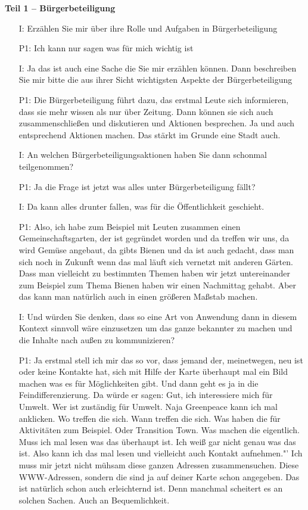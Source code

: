 \textbf{Teil 1 -- B{\"u}rgerbeteiligung}
\begin{itemize}
    \item[I:] Erz{\"a}hlen Sie mir {\"u}ber ihre Rolle und Aufgaben in B{\"u}rgerbeteiligung
    \item[P1:] Ich kann nur sagen was f{\"u}r mich wichtig ist
    \item[I:] Ja das ist auch eine Sache die Sie mir erz{\"a}hlen k{\"o}nnen. Dann beschreiben Sie mir bitte die aus ihrer Sicht wichtigsten Aspekte der B{\"u}rgerbeteiligung
    \item[P1:] Die B{\"u}rgerbeteiligung f{\"u}hrt dazu, das erstmal Leute sich informieren, dass sie mehr wissen als nur {\"u}ber Zeitung. Dann k{\"o}nnen sie sich auch zusammenschlie{\ss}en und diskutieren und Aktionen besprechen. Ja und auch entsprechend Aktionen machen. Das st{\"a}rkt im Grunde eine Stadt auch.
    \item[I:] An welchen B{\"u}rgerbeteiligungsaktionen haben Sie dann schonmal teilgenommen?
	\item[P1:] Ja die Frage ist jetzt was alles unter B{\"u}rgerbeteiligung f{\"a}llt?
	\item[I:] Da kann alles drunter fallen, was f{\"u}r die Öffentlichkeit geschieht.
	\item[P1:] Also, ich habe zum Beispiel mit Leuten zusammen einen Gemeinschaftsgarten, der ist gegr{\"u}ndet worden und da treffen wir uns, da wird Gem{\"u}se angebaut, da gibts Bienen und da ist auch gedacht, dass man sich noch in Zukunft wenn das mal l{\"a}uft sich vernetzt mit anderen G{\"a}rten. Dass man vielleicht zu bestimmten Themen haben wir jetzt untereinander zum Beispiel zum Thema Bienen haben wir einen Nachmittag gehabt. Aber das kann man nat{\"u}rlich auch in einen gr{\"o}{\ss}eren Ma{\ss}stab machen.
	\item[I:] Und w{\"u}rden Sie denken, dass so eine Art von Anwendung dann in diesem Kontext sinnvoll w{\"a}re einzusetzen um das ganze bekannter zu machen und die Inhalte nach au{\ss}en zu kommunizieren?
	\item[P1:] Ja erstmal stell ich mir das so vor, dass jemand der, meinetwegen, neu ist oder keine Kontakte hat, sich mit Hilfe der Karte {\"u}berhaupt mal ein Bild machen was es f{\"u}r M{\"o}glichkeiten gibt. Und dann geht es ja in die Feindifferenzierung. Da w{\"u}rde er sagen: Gut, ich interessiere mich f{\"u}r Umwelt. Wer ist zust{\"a}ndig f{\"u}r Umwelt. Naja Greenpeace kann ich mal anklicken. Wo treffen die sich. Wann treffen die sich. Was haben die f{\"u}r Aktivit{\"a}ten zum Beispiel. Oder Transition Town. Was machen die eigentlich. Muss ich mal lesen was das {\"u}berhaupt ist. Ich wei{\ss} gar nicht genau was das ist. Also kann ich das mal lesen und vielleicht auch Kontakt aufnehmen."' Ich muss mir jetzt nicht m{\"u}hsam diese ganzen Adressen zusammensuchen. Diese WWW-Adressen, sondern die sind ja auf deiner Karte schon angegeben. Das ist nat{\"u}rlich schon auch erleichternd ist. Denn manchmal scheitert es an solchen Sachen. Auch an Bequemlichkeit.

\end{itemize}
